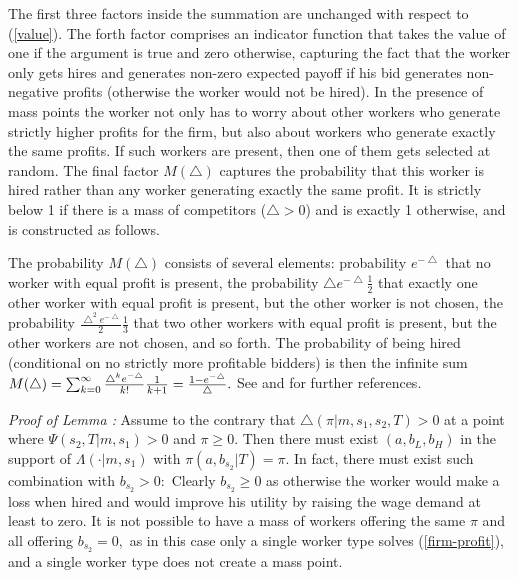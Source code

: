 \documentclass[12pt]{article}
\begin{document}
The first three factors inside the summation are unchanged with respect to (\ref{value}). The forth factor comprises an indicator function that takes the value of one if the argument is true and zero otherwise, capturing the fact that the worker only gets hires and generates non-zero expected payoff if his bid generates non-negative profits (otherwise the worker would not be hired). In the presence of mass points the worker not only has to worry about other workers who generate strictly higher profits for the firm, but also about workers who generate exactly the same profits. If such workers are present, then one of them gets selected at random. The final factor $M(\bigtriangleup )$ captures the probability that this worker is hired rather than any worker generating exactly the same profit. It is
strictly below 1 if there is a mass of
competitors ($\bigtriangleup >0$) and is exactly 1 otherwise, and is constructed as follows.

The probability $M(\bigtriangleup )$ consists of several elements:
probability $e^{-\bigtriangleup }$ that no worker with equal profit is
present, the probability $\bigtriangleup e^{-\bigtriangleup }\frac{1}{2}$
that exactly one other worker with equal profit is present, but the other
worker is not chosen, the probability $\frac{\bigtriangleup
^{2}e^{-\bigtriangleup }}{2}\frac{1}{3}$ that two other workers with equal
profit is present, but the other workers are not chosen, and so forth. The probability
of being hired (conditional on no strictly more profitable bidders) is then
the infinite sum $M(\bigtriangleup )=\sum_{k=0}^{\infty }\frac{\bigtriangleup
^{k}e^{-\bigtriangleup }}{k!}\frac{1}{k+1}=\frac{1-e^{-\bigtriangleup }}{%
\bigtriangleup }.$
See \cite{burdett_etal2001} and \cite{wright_etal2021} for further references. \\

\bigskip

\textit{Proof of Lemma%
:} Assume to the contrary
that $\bigtriangleup (\pi |m,s_{1},s_{2},T)>0$ at a point where $\Psi
(s_{2},T|m,s_{1})>0$ and $\pi \geq 0$. Then there must exist $%
(a,b_{L},b_{H}) $ in the support of $\Lambda (\cdot |m,s_{1})$ with $\pi
(a,b_{s_{2}}|T)=\pi .$ In fact, there must exist such combination with $%
b_{s_{2}}>0:$ Clearly $b_{s_{2}}\geq 0$ as otherwise the worker would make a
loss when hired and would improve his utility by raising the wage demand at
least to zero. It is not possible to have a mass of workers offering the
same $\pi $ and all offering $b_{s_{2}}=0,$ as in this case only a single
worker type solves (\ref{firm-profit}), and a single worker type does not
create a mass point.
\end{document}
